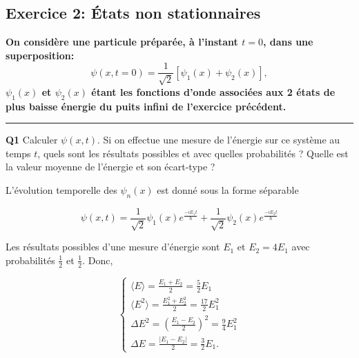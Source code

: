 \documentclass[french]{article}
\begin{document}
	\newpage

	\subsection*{Exercice 2: États non stationnaires}
	\textbf{On considère une particule préparée, à l'instant $t=0$, dans une superposition:
		\begin{equation}
		\psi(x, t=0) = \frac{1}{\sqrt{2}}[\psi_1(x) + \psi_2(x)],
		\end{equation}
		$\psi_1(x)$ et $\psi_2(x)$ étant les fonctions d'onde associées aux 2 états de plus baisse énergie du puits infini de l'exercice précédent.
	}
	\vspace{.3cm}
	\hrule
	\vspace{.3cm}
	{%
		\begin{tcolorbox}[colback=gray!5!white,colframe=gray!75!black]
			\textbf{\large{Q1}} Calculer $\psi(x,t)$. Si on effectue une mesure de l'énergie sur ce système au temps $t$, quels sont les résultats possibles et avec quelles probabilités ? Quelle est la valeur moyenne de l'énergie et son écart-type ?
		\end{tcolorbox}
		
		L'évolution temporelle des $\psi_n(x)$ est donné sous la forme séparable
		
		\begin{equation}
			\psi(x, t) = \frac{1}{\sqrt{2}}\psi_1(x)e^{\frac{-iE_1t}{\hbar}} + \frac{1}{\sqrt{2}}\psi_2(x)e^{\frac{-iE_2t}{\hbar}}
		\end{equation}
		
		Les résultats possibles d'une mesure d'énergie sont $E_1$ et $E_2 = 4E_1$ avec probabilités $\frac{1}{2}$ et $\frac{1}{2}$. Donc,
		
		\begin{equation}
			\begin{cases}
				\langle E \rangle = \frac{E_1 + E_2}{2} = \frac{5}{2}E_1\\
				\langle E^2 \rangle = \frac{E_1^2 + E_2^2}{2} = \frac{17}{2}E_1^2\\
				\Delta E^2 = \left(\frac{E_1 - E_2}{2}\right)^2 = \frac{9}{4}E_1^2 \\
				\Delta E = \frac{|E_1 - E_2|}{2} = \frac{3}{2}E_1.
			\end{cases}
		\end{equation}
	}
\end{document}
